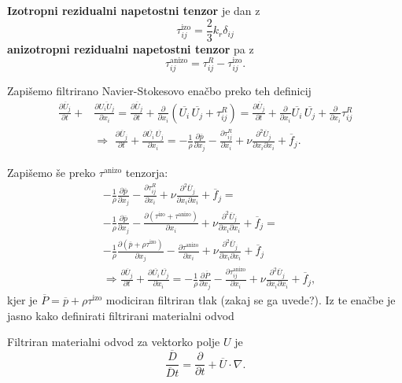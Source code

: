 \documentclass[mat2, tisk]{fmfdelo}
\begin{document}
\begin{definicija}
\textbf{Izotropni rezidualni napetostni tenzor} je dan z 
\begin{equation}
\tau_{ij}^\text{izo} = \frac{2}{3} k_r \delta_{ij}
\end{equation}
\textbf{anizotropni rezidualni napetostni tenzor} pa z 
\begin{equation}
\tau_{ij}^\text{anizo} = \tau_{ij}^R - \tau_{ij}^\text{izo}.
\end{equation}
\end{definicija}
\newpage
Zapišemo filtrirano Navier-Stokesovo enačbo preko teh definicij
\begin{align*}
\frac{\partial \overline{U}_j}{\partial t} + &\frac{\partial \overline{U_i U_j}}{\partial x_i} = 
\frac{\partial \overline{U}_j}{\partial t} + \frac{\partial}{\partial x_i} (\overline{U_i}\, \overline{U_j} + \tau_{ij}^R) = 
\frac{\partial \overline{U}_j}{\partial t} + \frac{\partial}{\partial x_i} \overline{U_i}\, \overline{U_j} + \frac{\partial}{\partial x_i} \tau_{ij}^R\\[2mm]
&\Longrightarrow \,\,
\frac{\partial \overline{U}_j}{\partial t} + \frac{\partial \overline{U_i}\, \overline{U_j}}{\partial x_i} = -\frac{1}{\rho} \frac{\partial \overline{p}}{\partial x_j} 
- \frac{\partial \tau_{ij}^R}{\partial x_i}+ \nu \frac{\partial^2 \overline{U}_j}{\partial x_i \partial x_i} + \overline{f}_j.
\end{align*}

Zapišemo še preko $\tau^\text{anizo}$ tenzorja:
\begin{align*}
&-\frac{1}{\rho} \frac{\partial \overline{p}}{\partial x_j} - \frac{\partial \tau_{ij}^R}{\partial x_i}+ \nu \frac{\partial^2 \overline{U}_j}{\partial x_i \partial x_i} + \overline{f}_j = \\[1mm]
&-\frac{1}{\rho} \frac{\partial \overline{p}}{\partial x_j} - \frac{\partial (\tau^\text{izo} + \tau^\text{anizo}) }{\partial x_i}+ \nu \frac{\partial^2 \overline{U}_j}{\partial x_i \partial x_i} + \overline{f}_j = \\[1mm]
&-\frac{1}{\rho} \frac{\partial (\overline{p} + \rho\tau^\text{izo})}{\partial x_j} - \frac{\partial \tau^\text{anizo} }{\partial x_i}+ \nu \frac{\partial^2 \overline{U}_j}{\partial x_i \partial x_i} + \overline{f}_j \\[2mm]
&\Longrightarrow 
\frac{\partial \overline{U}_j}{\partial t} + \frac{\partial \overline{U_i}\, \overline{U_j}}{\partial x_i} = -\frac{1}{\rho} \frac{\partial \overline{P}}{\partial x_j} 
- \frac{\partial \tau_{ij}^\text{anizo}}{\partial x_i}+ \nu \frac{\partial^2 \overline{U}_j}{\partial x_i \partial x_i} + \overline{f}_j,
\end{align*}
kjer je $\overline{P} = \overline{p} + \rho\tau^\text{izo}$ modiciran filtriran tlak 
(zakaj se ga uvede?). Iz te enačbe je jasno kako definirati filtrirani materialni odvod 
\begin{definicija}
Filtriran materialni odvod za vektorko polje $U$ je 
\begin{equation}
\frac{\overline{D}}{\overline{D}t} = \frac{\partial}{\partial t} + \overline{U}\cdot \nabla.
\end{equation}
\end{definicija}
\end{document}
